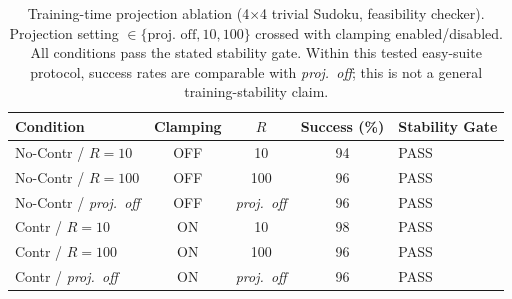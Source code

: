 \begin{table}[t]
\caption{Training-time projection ablation (4$\times$4 trivial Sudoku, feasibility checker).
Projection setting $\in\{\text{proj.\ off}, 10, 100\}$ crossed with clamping enabled/disabled.
All conditions pass the stated stability gate.
Within this tested easy-suite protocol, success rates are comparable with \emph{proj.\ off}; this is not a general training-stability claim.}
\label{tab:exp3_projection_ablation}
\centering
\small
\begin{tabular}{@{}lcccl@{}}
\toprule
Condition & Clamping & $R$ & Success (\%) & Stability Gate \\
\midrule
No-Contr / $R{=}10$ & OFF & 10 & 94 & PASS \\
No-Contr / $R{=}100$ & OFF & 100 & 96 & PASS \\
No-Contr / \emph{proj.\ off} & OFF & \emph{proj.\ off} & 96 & PASS \\
Contr / $R{=}10$ & ON & 10 & 98 & PASS \\
Contr / $R{=}100$ & ON & 100 & 96 & PASS \\
Contr / \emph{proj.\ off} & ON & \emph{proj.\ off} & 96 & PASS \\
\bottomrule
\end{tabular}
\end{table}
